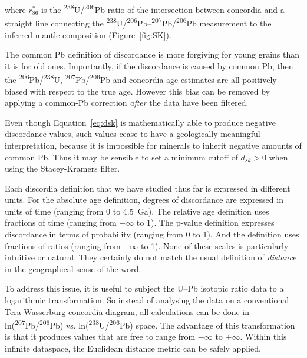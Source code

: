 \documentclass{article}
\begin{document}
\noindent where $r_{86}^\ast$ is the
\textsuperscript{238}U/\textsuperscript{206}Pb-ratio of the
intersection between concordia and a straight line connecting the
\textsuperscript{238}U/\textsuperscript{206}Pb--\textsuperscript{207}Pb/\textsuperscript{206}Pb
measurement to the inferred mantle composition (Figure~\ref{fig:SK}).

The common Pb definition of discordance is more forgiving for young
grains than it is for old ones. Importantly, if the discordance is
caused by common Pb, then the
\textsuperscript{206}Pb/\textsuperscript{238}U,
\textsuperscript{207}Pb/\textsuperscript{206}Pb and concordia age
estimates are all positively biased with respect to the true
age. However this bias can be removed by applying a common-Pb
correction \emph{after} the data have been filtered.

Even though Equation~\ref{eq:dsk} is mathematically able to produce
negative discordance values, such values cease to have a geologically
meaningful interpretation, because it is impossible for minerals to
inherit negative amounts of common Pb. Thus it may be sensible to set
a minimum cutoff of $d_{sk}>0$ when using the Stacey-Kramers filter.

Each discordia definition that we have studied thus far is expressed
in different units. For the absolute age definition, degrees of
discordance are expressed in units of time (ranging from 0 to
4.5~Ga). The relative age definition uses fractions of time (ranging
from $-\infty$ to 1). The p-value definition expresses discordance in
terms of probability (ranging from 0 to 1). And the \citet{stacey1975}
definition uses fractions of ratios (ranging from $-\infty$ to
1). None of these scales is particularly intuitive or natural. They
certainly do not match the usual definition of \emph{distance} in the
geographical sense of the word.

To address this issue, it is useful to subject the U--Pb isotopic
ratio data to a logarithmic transformation. So instead of analysing
the data on a conventional Tera-Wasserburg concordia diagram, all
calculations can be done in
ln(\textsuperscript{207}Pb/\textsuperscript{206}Pb) vs.
ln(\textsuperscript{238}U/\textsuperscript{206}Pb) space. The
advantage of this transformation is that it produces values that are
free to range from $-\infty$ to $+\infty$. Within this infinite
dataspace, the Euclidean distance metric can be safely applied.
\end{document}
